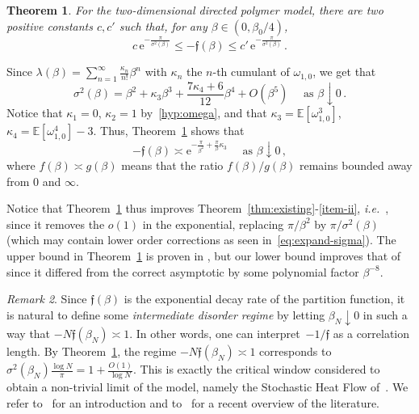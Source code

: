 \documentclass[11pt]{amsart}
\numberwithin{equation}{section}
\newcommand*{\EE}{\mathbb{E}}
\newcommand{\e}{\mathrm{e}}
\newcommand*{\tf}{\mathfrak{f}}
\theoremstyle{plain}
\newtheorem{theorem}{Theorem}[section]
\theoremstyle{definition}
\theoremstyle{remark}
\newtheorem{remark}[theorem]{Remark}
\begin{document}
\begin{theorem}
       \label{thm:fe}
       For the two-dimensional directed polymer model, there are two positive constants \(c,c'\) such that, for any \(\beta\in (0,\beta_0/4)\),
       \[
        c\, \e^{- \frac{\pi}{\sigma^2(\beta)}} \leq - \tf(\beta) \leq  c'\, \e^{- \frac{\pi}{\sigma^2(\beta)}} \,.
       \]
\end{theorem}




Since \(\lambda(\beta) = \sum_{n=1}^{\infty} \frac{\kappa_n}{n!} \beta^n\) with \(\kappa_n\) the \(n\)-th cumulant of \(\omega_{1,0}\), we get that 
\begin{equation}
       \label{eq:expand-sigma}
       \sigma^2(\beta) = \beta^2 + \kappa_3 \beta^3 + \frac{7\kappa_4+6}{12} \beta^4 +O(\beta^5) \quad \text{ as } \beta\downarrow 0 \,. 
\end{equation}
Notice that \(\kappa_1=0\), \(\kappa_2=1\) by~\eqref{hyp:omega}, and that \(\kappa_3= \EE[\omega_{1,0}^3]\), \(\kappa_4 = \EE[\omega_{1,0}^4]-3\).
Thus, Theorem~\ref{thm:fe} shows that
\[
-\tf(\beta)  \asymp \e^{-\frac{\pi}{\beta^2} + \frac{\pi}{\beta} \kappa_3}  \quad \text{ as } \beta\downarrow 0 \,,
\]
where \(f(\beta) \asymp g(\beta)\) means that the ratio \(f(\beta)/g(\beta)\) remains bounded away from \(0\) and \(\infty\).


Notice that Theorem~\ref{thm:fe} thus improves Theorem~\ref{thm:existing}-\ref{item-ii}, \textit{i.e.}\ \cite{BL17}, since it removes the \(o(1)\) in the exponential, replacing \(\pi/\beta^2\) by \(\pi/\sigma^2(\beta)\) (which may contain lower order corrections as seen in~\eqref{eq:expand-sigma}).
The upper bound in Theorem~\ref{thm:fe} is proven in \cite[Theorem~2.8]{BCT25}, but our lower bound improves that of \cite[Theorem~2.8]{BCT25} since it differed from the correct asymptotic by some polynomial factor \(\beta^{-8}\).


\begin{remark}
       \label{rem:critical-window}
       Since \(\tf(\beta)\) is the exponential decay rate of the partition function, it is natural to define some \emph{intermediate disorder regime} by letting \(\beta_N\downarrow 0\) in such a way that \(-N\tf(\beta_N) \asymp 1\).
       In other words, one can interpret~\(-1/\tf\) as a correlation length.
       By Theorem~\ref{thm:fe}, the regime \(-N\tf(\beta_N) \asymp 1\) corresponds to \( \sigma^2 (\beta_N) \frac{\log N}{\pi}= 1+ \frac{O(1)}{\log N}\).
       This is exactly the critical window considered to obtain a non-trivial limit of the model, namely the Stochastic Heat Flow of~\cite{CSZ23}. 
       We refer to~\cite{CSZ24-rev} for an introduction and to~\cite{CSZ25} for a recent overview of the literature.
\end{remark}
\end{document}
